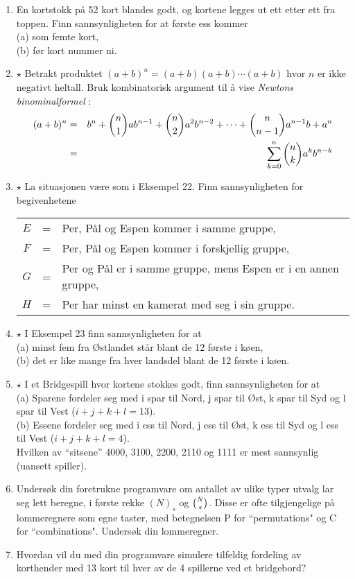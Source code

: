 \begin{enumerate}
\item  En kortstokk på 52 kort blandes godt, og kortene legges ut
     ett etter ett fra toppen. Finn sannsynligheten for at første
     ess kommer\\
     (a)  som femte kort,\\
     (b)  før kort nummer ni.

\item  $\star$ Betrakt produktet $(a+b)^n=(a+b)(a+b)\cdots (a+b)$ hvor $n$
     er ikke negativt heltall. Bruk kombinatorisk argument til
     å vise {\em Newtons binominalformel} :
\begin{eqnarray*}
      (a+b)^n&=&b^n+{{n}\choose{1}}ab^{n-1}+{{n}\choose{2}}a^2b^{n-2}+ \cdots
                               +{{n}\choose{n-1}}a^{n-1}b+a^n  \\
             &=&\sum_{k=0}^{n} {{n}\choose{k}}a^kb^{n-k} 
\end{eqnarray*}

\item  $\star$ La situasjonen være som i Eksempel 22. Finn sannsynligheten
     for begivenhetene \\
\begin{tabular}{ccl}
    $E$ & = &  Per, Pål og Espen kommer i samme gruppe,\\
    $F$ & = & Per, Pål og Espen kommer i forskjellig gruppe,\\
    $G$ & = &  Per og Pål er i samme gruppe, mens Espen er i en annen
          gruppe,\\
    $H$ & = & Per har minst en kamerat med seg i sin gruppe.
\end{tabular}                                        

\item  $\star$ I Eksempel 23 finn sannsynligheten for at\\
    (a)  minst fem fra Østlandet står blant de 12 første i køen,\\
     (b)  det er like mange fra hver landsdel blant de 12 første
          i køen.

\item  $\star$ I et Bridgespill hvor kortene stokkes godt, finn
     sannsynligheten for at\\
     (a)  Sparene fordeler seg med i spar til Nord, j spar til   
          Øst, k spar til Syd og l spar til Vest ($i+j+k+l=13$).\\
     (b)  Essene fordeler seg med i ess til Nord, j ess til Øst,
          k ess til Syd og l ess til Vest ($i+j+k+l=4$).\\
Hvilken av ``sitsene'' 4000, 3100, 2200, 2110 og 1111 er mest
sannsynlig (uansett spiller).

\item Undersøk din foretrukne programvare om antallet av ulike typer utvalg 
      lar seg lett beregne, i første rekke $(N)_s$ og $ {{N}\choose{s}}$.
      Disse er ofte tilgjengelige på lommeregnere som egne taster, med
      betegnelsen P for ``permutations" og C for ``combinations".
      Undersøk din lommeregner.
\item Hvordan vil du med din programvare simulere tilfeldig fordeling av
      kort\-hender med 13 kort til hver av de 4 spillerne ved et bridgebord?
\end{enumerate}
\normalsize
